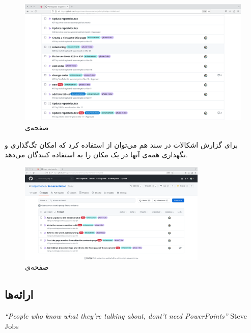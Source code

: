 \begin{figure}[H]
	\caption{صفحه‌ی }
\begin{center}
	\includegraphics[angle=90, width=\textwidth, height=\textheight]{./images/prs}
\end{center}
\end{figure}

برای گزارش اشکالات در سند هم می‌توان از  استفاده کرد که امکان تگ‌گذاری و نگهداری همه‌ی آنها در یک مکان را به استفاده کنندگان می‌دهد.
\begin{figure}[H]
	\caption{صفحه‌ی }
	\begin{center}
		\includegraphics[angle=90, width=0.8\textwidth, height=0.8\textheight]{./images/issues}
	\end{center}
\end{figure}

\subsection{ارائه‌ها}

\begin{latin}
	\begin{center}
		\textit{``People who know what they're talking about, dont't need PowerPoints''} Steve Jobs
	\end{center}
\end{latin}

